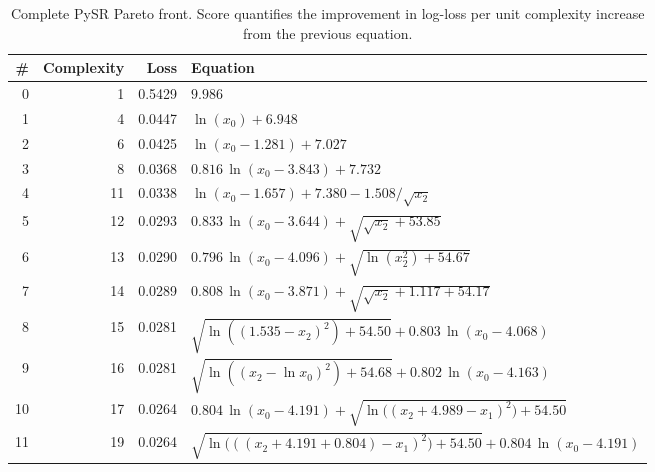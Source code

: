 \documentclass[12pt, a4paper]{article}
\begin{document}
\begin{table}[H]
  \centering
  \caption{Complete PySR Pareto front.  Score quantifies the improvement in log-loss per unit complexity increase from the previous equation.}
  \label{tab:full_pareto}
  \footnotesize
  \begin{tabular}{@{}rrrl@{}}
    \toprule
    \# & Complexity & Loss & Equation \\
    \midrule
    0  & 1  & 0.5429 & $9.986$ \\
    1  & 4  & 0.0447 & $\ln(x_0) + 6.948$ \\
    2  & 6  & 0.0425 & $\ln(x_0 - 1.281) + 7.027$ \\
    3  & 8  & 0.0368 & $0.816\,\ln(x_0 - 3.843) + 7.732$ \\
    4  & 11 & 0.0338 & $\ln(x_0 - 1.657) + 7.380 - 1.508 / \sqrt{x_2}$ \\
    5  & 12 & 0.0293 & $0.833\,\ln(x_0 - 3.644) + \sqrt{\sqrt{x_2} + 53.85}$ \\
    6  & 13 & 0.0290 & $0.796\,\ln(x_0 - 4.096) + \sqrt{\ln(x_2^2) + 54.67}$ \\
    7  & 14 & 0.0289 & $0.808\,\ln(x_0 - 3.871) + \sqrt{\sqrt{x_2} + 1.117 + 54.17}$ \\
    8  & 15 & 0.0281 & $\sqrt{\ln((1.535 - x_2)^2) + 54.50} + 0.803\,\ln(x_0 - 4.068)$ \\
    9  & 16 & 0.0281 & $\sqrt{\ln((x_2 - \ln x_0)^2) + 54.68} + 0.802\,\ln(x_0 - 4.163)$ \\
    10 & 17 & 0.0264 & $0.804\,\ln(x_0 - 4.191) + \sqrt{\ln\bigl((x_2 + 4.989 - x_1)^2\bigr) + 54.50}$ \\
    11 & 19 & 0.0264 & $\sqrt{\ln\bigl(((x_2 + 4.191 + 0.804) - x_1)^2\bigr) + 54.50} + 0.804\,\ln(x_0 - 4.191)$ \\
    \bottomrule
  \end{tabular}
\end{table}
\end{document}
